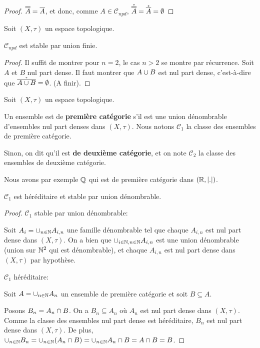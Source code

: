 \ifdefined\outputproof
\begin{proof}
	$\overline{\overline{A}} = \overline{A}$, et donc, comme $A \in \mathcal{C}_{npd}$,
	$\mathring{\overline{\overline{A}}} = \mathring{\overline{A}} = \emptyset$
\end{proof}
\fi

\begin{proposition}
	Soit $(X, \tau)$ un espace topologique.

	$\mathcal{C}_{npd}$ est stable par union finie.
\end{proposition}

\ifdefined\outputproof
\begin{proof}
	Il suffit de montrer pour $n = 2$, le cas $n > 2$ se montre par récurrence.
	Soit $A$ et $B$ nul part dense. Il faut montrer que $A \cup B$ est nul
	part dense, c'est-à-dire que $\mathring{\overline{A \cup B}} = \emptyset$. (A
	finir).
\end{proof}
\fi

\begin{definition} 
	Soit $(X, \tau)$ un espace topologique.

	Un ensemble est de \textbf{première catégorie} s'il est une union
	dénombrable d'ensembles nul part denses dans $(X, \tau)$. Nous notons $\mathcal{C}_{1}$ la
	classe des ensembles de première catégorie.

	Sinon, on dit qu'il est \textbf{de deuxième catégorie}, et on
	note $\mathcal{C}_{2}$ la classe des ensembles de deuxième catégorie.
\end{definition}

Nous avons par exemple $\mathbb{Q}$ qui est de première catégorie dans $(\mathbb{R},
\abs{.})$.

\begin{proposition}
	$\mathcal{C}_{1}$ est héréditaire et stable par union
	dénombrable.
\end{proposition}

\ifdefined\outputproof
\begin{proof}
	$\mathcal{C}_{1}$ stable par union dénombrable:

	Soit $A_{i} = \cup_{n \in \mathbb{N}} A_{i, n}$ une famille dénombrable tel
	que chaque $A_{i, n}$ est nul part dense dans $(X, \tau)$. On a bien que
	$\cup_{i \in \mathbb{N},
	n \in \mathbb{N}} A_{i, n}$ est une union dénombrable (union sur
	$\mathbb{N}^{2}$ qui est dénombrable), et chaque $A_{i, n}$
	est nul part dense dans $(X, \tau)$ par hypothèse.

	$\mathcal{C}_{1}$ héréditaire:

	Soit $A = \cup_{n \in \mathbb{N}} A_{n}$ un ensemble de première catégorie
	et soit $B \subseteq A$.

	Posons $B_{n} = A_{n} \cap B$. On a $B_{n} \subseteq A_{n}$ où $A_{n}$ est
	nul part dense dans $(X, \tau)$. Comme la classe des ensembles nul part
	dense est
	héréditaire, $B_{n}$ est nul part dense dans $(X, \tau)$.
	De plus, $\cup_{n \in \mathbb{N}} B_{n} = \cup_{n \in \mathbb{N}} (A_{n}
	\cap B) = \cup_{n \in \mathbb{N}} A_{n} \cap B = A \cap B = B$.
\end{proof}
\fi

